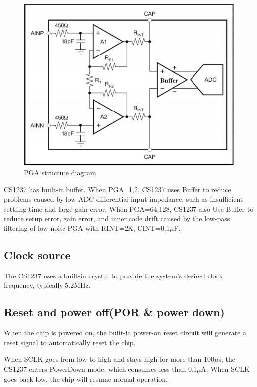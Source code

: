 \documentclass{article}
\begin{document}
\begin{figure}[h]
    \centering
    \includegraphics[width=1\textwidth]{fig4.png}
    \caption{PGA structure diagram}
    \label{fig:fig4}
\end{figure}

CS1237 has built-in buffer. 
When PGA=1,2, CS1237 uses Buffer to reduce problems caused by low ADC differential input impedance, such
as insufficient settling time and large gain error. 
When PGA=64,128, CS1237 also Use Buffer to reduce setup error, gain error, and inner code drift caused by
the low-pass filtering of low noise PGA with RINT=2K, CINT=0.1$\mu$F.

\subsection{Clock source}

The CS1237 uses a built-in crystal to provide the system's desired clock frequency, typically 5.2MHz.

\subsection{Reset and power off(POR \& power down)}

When the chip is powered on, the built-in power-on reset circuit will generate a reset signal to
automatically reset the chip.

When SCLK goes from low to high and stays high for more than 100$\mu$s, the CS1237 enters PowerDown mode,
which consumes less than 0.1$\mu$A. When SCLK goes back low, the chip will resume normal operation.
\end{document}

